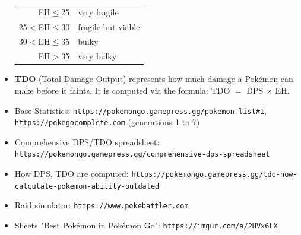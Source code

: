 \documentclass[8pt,aspectratio=169,compress]{beamer}
\renewcommand{\baselinestretch}{1.1}
\begin{document}
\begin{frame}
\begin{block}{}
\begin{tiny}
\begin{itemize}
\begin{center}
\end{center}
\begin{center}
\begin{tabular}{rl}
EH$\leq$25   &  very fragile  \\
25$<$EH$\leq$30   &  fragile but viable  \\
30$<$EH$\leq$35   &  bulky  \\
EH$>$35   &  very bulky  \\
\end{tabular}
\end{center}
\item \textbf{TDO} (Total Damage Output) represents how much damage a Pok\'emon can make before it faints. It is computed via the formula: 
TDO $=$ DPS $\times$ EH.
  \item Base Statistics: \texttt{https://pokemongo.gamepress.gg/pokemon-list\#1}, \texttt{https://pokegocomplete.com} (generations 1 to 7)
  \item Comprehensive DPS/TDO spreadsheet: \texttt{https://pokemongo.gamepress.gg/comprehensive-dps-spreadsheet}
  \item How DPS, TDO are computed: \texttt{https://pokemongo.gamepress.gg/tdo-how-calculate-pokemon-ability-outdated}
  \item Raid simulator: \texttt{https://www.pokebattler.com}
  \item Sheets "Best Pok\'emon in Pok\'emon Go": \texttt{https://imgur.com/a/2HVx6LX}%
\end{itemize}
\end{tiny}
\end{block}
\end{frame}

\renewcommand{\baselinestretch}{1.1}
\end{document}
